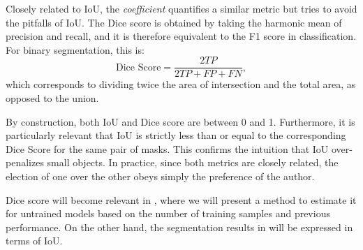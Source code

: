 Closely related to IoU, the \textit{ coefficient} quantifies a similar metric but tries to avoid the pitfalls of IoU. The Dice score is obtained by taking the harmonic mean of precision and recall, and it is therefore equivalent to the F1 score in classification. For binary segmentation, this is:
\begin{equation*}
    \text{Dice Score} = \dfrac{2TP}{2TP + FP + FN},
    \label{eq:dice}
\end{equation*}
which corresponds to dividing twice the area of intersection and the total area, as opposed to the union.

By construction, both IoU and Dice score are  between 0 and 1. Furthermore, it is particularly relevant that IoU is strictly less than or equal to the corresponding Dice Score for the same pair of masks. This confirms the intuition that IoU over-penalizes small objects. In practice, since both metrics are closely related, the election of one over the other obeys simply the preference of the author. 

Dice score will become relevant in , where we will present a method to estimate it for untrained models based on the number of training samples and previous performance. On the other hand, the segmentation results in  will be expressed in terms of IoU.
